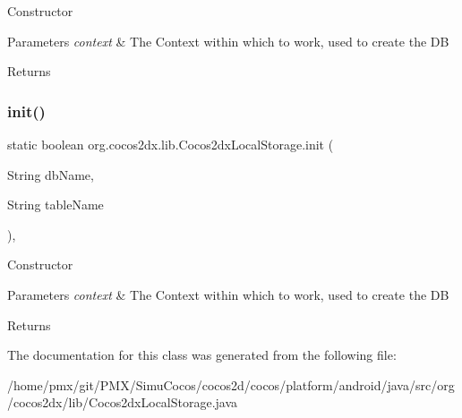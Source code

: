 Constructor 
\begin{DoxyParams}{Parameters}
{\em context} & The Context within which to work, used to create the DB \\
\hline
\end{DoxyParams}
\begin{DoxyReturn}{Returns}

\end{DoxyReturn}
\mbox{\label{classorg_1_1cocos2dx_1_1lib_1_1Cocos2dxLocalStorage_ac878c872715e26f8848749cdd8b0cede}} 
\subsubsection{\texorpdfstring{init()}{init()}\hspace{0.1cm}{\footnotesize\ttfamily [2/2]}}
{\footnotesize\ttfamily static boolean org.\+cocos2dx.\+lib.\+Cocos2dx\+Local\+Storage.\+init (\begin{DoxyParamCaption}\item[{String}]{db\+Name,  }\item[{String}]{table\+Name }\end{DoxyParamCaption})\hspace{0.3cm}{\ttfamily [inline]}, {\ttfamily [static]}}

Constructor 
\begin{DoxyParams}{Parameters}
{\em context} & The Context within which to work, used to create the DB \\
\hline
\end{DoxyParams}
\begin{DoxyReturn}{Returns}

\end{DoxyReturn}


The documentation for this class was generated from the following file\+:\begin{DoxyCompactItemize}
\item 
/home/pmx/git/\+P\+M\+X/\+Simu\+Cocos/cocos2d/cocos/platform/android/java/src/org/cocos2dx/lib/Cocos2dx\+Local\+Storage.\+java\end{DoxyCompactItemize}
